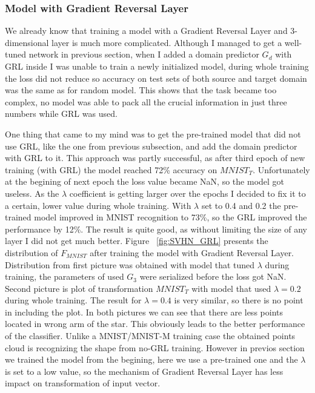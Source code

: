 \documentclass{article}
\begin{document}
\subsubsection{Model with Gradient Reversal Layer}
\par
We already know that training a model with a Gradient Reversal Layer and 3-dimensional layer is much more complicated. Although I managed to get a well-tuned network in previous section, when I added a domain predictor $G_{d}$ with GRL inside I was unable to train a newly initialized model, during whole training the loss did not reduce so accuracy on test sets of both source and target domain was the same as for random model. This shows that the task became too complex, no model was able to pack all the crucial information in just three numbers while GRL was used. 
\par
One thing that came to my mind was to get the pre-trained model that did not use GRL, like the one from previous subsection, and add the domain predictor with GRL to it. This approach was partly successful, as after third epoch of new training (with GRL) the model reached 72\% accuracy on $MNIST_{T}$. Unfortunately at the begining of next epoch the loss value became NaN, so the model got useless. As the $\lambda$ coefficient is getting larger over the epochs I decided to fix it to a certain, lower value during whole training. With $\lambda$ set to 0.4 and 0.2 the pre-trained model improved in MNIST recognition to 73\%, so the GRL improved the performance by 12\%. The result is quite good, as without limiting the size of any layer I did not get much better. Figure ~\ref{fig:SVHN_GRL} presents the distribution of $F_{MNIST}$ after training the model with Gradient Reversal Layer. Distribution from first picture was obtained with model that tuned $\lambda$ during training, the parameters of used $G_{3}$ were serialized before the loss got NaN. Second picture is plot of transformation $MNIST_{T}$ with model that used $\lambda = 0.2$ during whole training. The result for $\lambda = 0.4$ is very similar, so there is no point in including the plot. In both pictures we can see that there are less points located in wrong arm of the star. This obviously leads to the better performance of the classifier. Unlike a MNIST/MNIST-M training case the obtained points cloud is recognizing the shape from no-GRL training. However in previos section we trained the model from the begining, here we use a pre-trained one and the $\lambda$ is set to a low value, so the mechanism of Gradient Reversal Layer has less impact on transformation of input vector.
\end{document}
